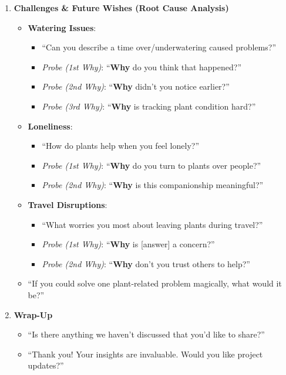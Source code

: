 \documentclass[math,code]{amznotes}
\theoremstyle{remark}
\begin{document}
\begin{enumerate}
    \item \textbf{Challenges \& Future Wishes (Root Cause Analysis)}
    \begin{itemize}
        \item \textbf{Watering Issues}:
        \begin{itemize}
            \item ``Can you describe a time over/underwatering caused problems?''
            \item \textit{Probe (1st Why)}: ``\textbf{Why} do you think that happened?''
            \item \textit{Probe (2nd Why)}: ``\textbf{Why} didn’t you notice earlier?''
            \item \textit{Probe (3rd Why)}: ``\textbf{Why} is tracking plant condition hard?''
        \end{itemize}
        \item \textbf{Loneliness}:
        \begin{itemize}
            \item ``How do plants help when you feel lonely?''
            \item \textit{Probe (1st Why)}: ``\textbf{Why} do you turn to plants over people?''
            \item \textit{Probe (2nd Why)}: ``\textbf{Why} is this companionship meaningful?''
        \end{itemize}
        \item \textbf{Travel Disruptions}:
        \begin{itemize}
            \item ``What worries you most about leaving plants during travel?''
            \item \textit{Probe (1st Why)}: ``\textbf{Why} is [answer] a concern?''
            \item \textit{Probe (2nd Why)}: ``\textbf{Why} don’t you trust others to help?''
        \end{itemize}
        \item ``If you could solve one plant-related problem magically, what would it be?''
    \end{itemize}
    
    \item \textbf{Wrap-Up}
    \begin{itemize}
        \item ``Is there anything we haven’t discussed that you’d like to share?''
        \item ``Thank you! Your insights are invaluable. Would you like project updates?''
    \end{itemize}
\end{enumerate}
\end{document}
